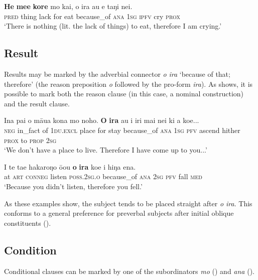 \ea\label{ex:11.259}
\gll \textbf{He} \textbf{me{\ꞌ}e} \textbf{kore} mo kai, {\ꞌ}o ira au e taŋi nei. \\
\textsc{pred} thing lack for eat because\_of \textsc{ana} \textsc{1sg} \textsc{ipfv} cry \textsc{prox} \\

\glt 
‘There is nothing (lit. the lack of things) to eat, therefore I am crying.’ \textstyleExampleref{[R349.013]} 
\z
{}

\subsection{Result}\label{sec:11.6.5}

Results may be marked by the adverbial connector \textit{{\ꞌ}o} \textit{ira} ‘because of that; therefore’ (the reason preposition \textit{{\ꞌ}o} followed by the pro-form \textit{ira}). As  shows, it is possible to mark both the reason clause (in this case, a nominal construction) and the result clause.

\ea\label{ex:11.260}
\gll {\ꞌ}Ina pa{\ꞌ}i o māua kona mo noho. \textbf{{\ꞌ}O} \textbf{ira} au i iri mai nei  ki a koe...\\
\textsc{neg} in\_fact of \textsc{1du.excl} place for stay because\_of \textsc{ana} \textsc{1sg} \textsc{pfv} ascend hither \textsc{prox}  to \textsc{prop} \textsc{2sg}\\

\glt 
‘We don’t have a place to live. Therefore I have come up to you...’ \textstyleExampleref{[R229.210–211]}
\z

\ea\label{ex:11.261}
\gll {\ꞌ}I te ta{\ꞌ}e hakaroŋo ō{\ꞌ}ou \textbf{{\ꞌ}o} \textbf{ira} koe i hiŋa ena.\\
at \textsc{art} \textsc{conneg} listen \textsc{poss.2sg.o} because\_of \textsc{ana} \textsc{2sg} \textsc{pfv} fall \textsc{med}\\

\glt
‘Because you didn’t listen, therefore you fell.’ \textstyleExampleref{[R481.136]} 
\z

As these examples show, the subject tends to be placed straight after \textit{{\ꞌ}o ira}. This conforms to a general preference for preverbal subjects after initial oblique constituents ().
\subsection{Condition} \label{sec:11.6.6}
Conditional clauses can be marked by one of the subordinators \textit{mo} () and \textit{ana} (). 

